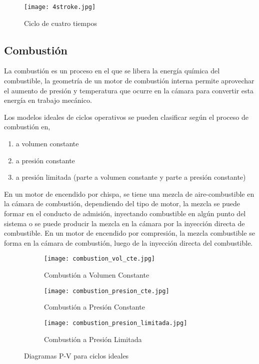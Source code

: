 \begin{figure}
    \centering
    \texttt{[image: 4stroke.jpg]}
    \caption{Ciclo de cuatro tiempos}\label{fig:4tiempos}
\end{figure}


\subsection{Combustión}
%
La combustión es un proceso en el que se libera la energía química del
combustible, la geometría de un motor de combustión interna permite aprovechar
el aumento de presión y temperatura que ocurre en la cámara para convertir esta
energía en trabajo mecánico.
%

Los modelos ideales de ciclos operativos se pueden clasificar según el proceso
de combustión en,
%
\begin{enumerate}
    \item a volumen constante
    \item a presión constante
    \item a presión limitada (parte a volumen constante y parte a
        presión constante)
\end{enumerate}

En un motor de encendido por chispa, se tiene una mezcla de aire-combustible en
la cámara de combustión, dependiendo del tipo de motor, la mezcla se puede
formar en el conducto de admisión, inyectando combustible en algún punto del
sistema o se puede producir la mezcla en la cámara por la inyección directa de
combustible.
%
En un motor de encendido por compresión, la mezcla combustible se forma en la
cámara de combustión, luego de la inyección directa del combustible.

\begin{figure}
    \centering
    \begin{subfigure}{0.4\textwidth}
        \centering
        \texttt{[image: combustion\_vol\_cte.jpg]}
        \caption{Combustión a Volumen Constante}
    \end{subfigure}
    \hfill
    \begin{subfigure}{0.4\textwidth}
        \centering
        \texttt{[image: combustion\_presion\_cte.jpg]}
        \caption{Combustión a Presión Constante}
    \end{subfigure}
    \hfill
    \begin{subfigure}{0.4\textwidth}
        \centering
        \texttt{[image: combustion\_presion\_limitada.jpg]}
        \caption{Combustión a Presión Limitada}
    \end{subfigure}
    \caption{Diagramas P-V para ciclos ideales\parencite{heywood}}\label{fig:ciclos_ideales}
\end{figure}

